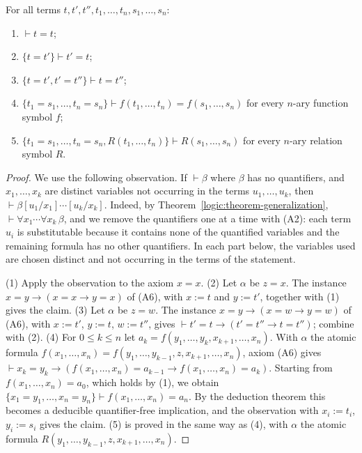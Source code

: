 \begin{lemma}[Equality]\label{logic:lemma-equality}
For all terms $t, t', t'', t_1, \ldots, t_n, s_1, \ldots, s_n$:
\begin{enumerate}
\item $\vdash t = t$;
\item $\{t = t'\} \vdash t' = t$;
\item $\{t = t', t' = t''\} \vdash t = t''$;
\item $\{t_1 = s_1, \ldots, t_n = s_n\} \vdash f(t_1, \ldots, t_n) = f(s_1, \ldots, s_n)$
for every $n$-ary function symbol $f$;
\item $\{t_1 = s_1, \ldots, t_n = s_n, R(t_1, \ldots, t_n)\} \vdash R(s_1, \ldots, s_n)$
for every $n$-ary relation symbol $R$.
\end{enumerate}
\end{lemma}

\begin{proof}
We use the following observation. If $\vdash \beta$ where $\beta$ has no
quantifiers, and $x_1, \ldots, x_k$ are distinct variables not occurring in the
terms $u_1, \ldots, u_k$, then
$\vdash \beta[u_1/x_1] \cdots [u_k/x_k]$. Indeed, by
Theorem~\ref{logic:theorem-generalization},
$\vdash \forall x_1 \cdots \forall x_k\, \beta$, and we remove the quantifiers
one at a time with (A2): each term $u_i$ is substitutable because it contains
none of the quantified variables and the remaining formula has no other
quantifiers. In each part below, the variables used are chosen distinct and
not occurring in the terms of the statement.

(1) Apply the observation to the axiom $x = x$.
(2) Let $\alpha$ be $z = x$. The instance $x = y \to (x = x \to y = x)$ of (A6),
with $x := t$ and $y := t'$, together with (1) gives the claim.
(3) Let $\alpha$ be $z = w$. The instance $x = y \to (x = w \to y = w)$ of (A6),
with $x := t'$, $y := t$, $w := t''$, gives
$\vdash t' = t \to (t' = t'' \to t = t'')$; combine with (2).
(4) For $0 \leq k \leq n$ let $a_k = f(y_1, \ldots, y_k, x_{k+1}, \ldots, x_n)$.
With $\alpha$ the atomic formula
$f(x_1, \ldots, x_n) = f(y_1, \ldots, y_{k-1}, z, x_{k+1}, \ldots, x_n)$, axiom
(A6) gives $\vdash x_k = y_k \to (f(x_1, \ldots, x_n) = a_{k-1} \to f(x_1, \ldots, x_n) = a_k)$.
Starting from $f(x_1, \ldots, x_n) = a_0$, which holds by (1), we obtain
$\{x_1 = y_1, \ldots, x_n = y_n\} \vdash f(x_1, \ldots, x_n) = a_n$. By the
deduction theorem this becomes a deducible quantifier-free implication, and
the observation with $x_i := t_i$, $y_i := s_i$ gives the claim.
(5) is proved in the same way as (4), with $\alpha$ the atomic formula
$R(y_1, \ldots, y_{k-1}, z, x_{k+1}, \ldots, x_n)$.
\end{proof}

